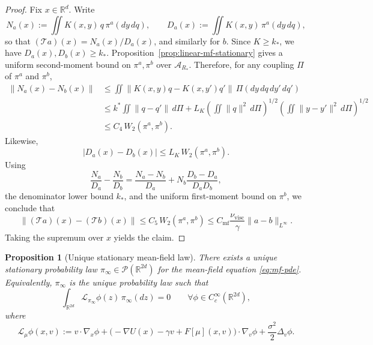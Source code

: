 \documentclass[11pt]{article}
\newtheorem{proposition}[theorem]{Proposition}
\theoremstyle{definition}
\theoremstyle{remark}
\newcommand{\R}{\mathbb{R}}
\newcommand{\mcP}{\mathcal{P}}
\begin{document}
\begin{proof}
Fix \(x\in\R^d\). Write
\[
N_a(x):=\iint K(x,y)\,q\,\pi^a(dy\,dq),
\qquad
D_a(x):=\iint K(x,y)\,\pi^a(dy\,dq),
\]
so that \((\mathcal T a)(x)=N_a(x)/D_a(x)\), and similarly for \(b\). Since
\(K\ge k_*\), we have \(D_a(x),D_b(x)\ge k_*\). Proposition~\ref{prop:linear-mf-stationary}
gives a uniform second-moment bound on \(\pi^a,\pi^b\) over
\(\mathcal A_{R_*}\). Therefore, for any coupling \(\Pi\) of \(\pi^a\) and
\(\pi^b\),
\begin{align*}
\|N_a(x)-N_b(x)\|
&\le
\iint
\|K(x,y)q-K(x,y')q'\|\,\Pi(dy\,dq\,dy'\,dq')\\
&\le
k^*\iint \|q-q'\|\,d\Pi
+L_K\left(\iint \|q\|^2\,d\Pi\right)^{1/2}
\left(\iint \|y-y'\|^2\,d\Pi\right)^{1/2}\\
&\le
C_4\,W_2(\pi^a,\pi^b).
\end{align*}
Likewise,
\[
|D_a(x)-D_b(x)|
\le
L_K\,W_2(\pi^a,\pi^b).
\]
Using
\[
\frac{N_a}{D_a}-\frac{N_b}{D_b}
=
\frac{N_a-N_b}{D_a}
+N_b\frac{D_b-D_a}{D_aD_b},
\]
the denominator lower bound \(k_*\), and the uniform first-moment bound on
\(\pi^b\), we conclude that
\[
\|(\mathcal T a)(x)-(\mathcal T b)(x)\|
\le
C_5\,W_2(\pi^a,\pi^b)
\le
C_{\mathrm{mf}}\frac{\nu_{\mathrm{visc}}}{\gamma}\|a-b\|_{L^\infty}.
\]
Taking the supremum over \(x\) yields the claim.
\end{proof}

\begin{proposition}[Unique stationary mean-field law]\label{prop:mf-unique}
There exists a unique stationary probability law \(\pi_\infty\in\mcP(\R^{2d})\)
for the mean-field equation \eqref{eq:mf-pde}. Equivalently,
\(\pi_\infty\) is the unique probability law such that
\begin{equation}\label{eq:mf-stationary-weak}
\int_{\R^{2d}} \mathcal L_{\pi_\infty}\phi(z)\,\pi_\infty(dz)=0
\qquad
\forall \phi\in C_c^\infty(\R^{2d}),
\end{equation}
where
\[
\mathcal L_\mu \phi(x,v)
:=
v\cdot \nabla_x \phi
+\bigl(-\nabla U(x)-\gamma v+F[\mu](x,v)\bigr)\cdot \nabla_v \phi
+\frac{\sigma^2}{2}\Delta_v \phi.
\]
\end{proposition}
\end{document}
